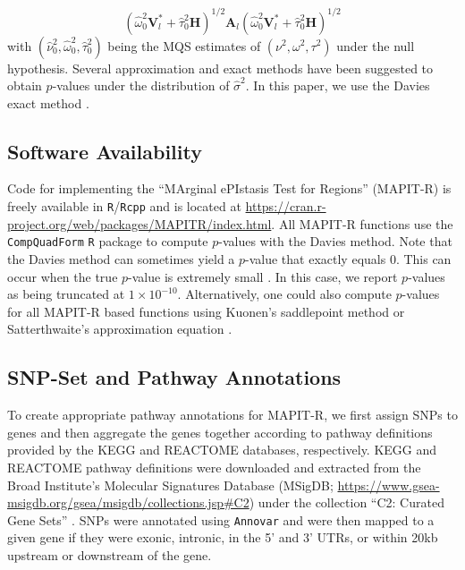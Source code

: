 \documentclass[10pt]{article}
\newcommand{\bV}{\mathbf{V}}
\newcommand{\bA}{\mathbf{A}}
\newcommand{\bH}{\mathbf{H}}
\newcommand{\wh}{\widehat}
\begin{document}
\begin{equation*}
\left(\wh\omega^2_{0}\bV^*_l+\wh\tau^2_{0}\bH\right)^{1/2}\bA_{l}\left(\wh\omega^2_{0}\bV^*_l+\wh\tau^2_{0}\bH\right)^{1/2} 
\end{equation*}
with $(\wh\nu^2_{0},\wh\omega^2_{0},\wh\tau^2_{0})$ being the MQS estimates of $(\nu^2,\omega^2,\tau^2)$ under the null hypothesis. Several approximation and exact methods have been suggested to obtain $p$-values under the distribution of $\wh\sigma^2$. In this paper, we use the Davies exact method \cite{Davies1980,Wu2011}. 

\subsection*{Software Availability}

Code for implementing the ``MArginal ePIstasis Test for Regions'' (MAPIT-R) is freely available in \texttt{R}/\texttt{Rcpp} and is located at \url{https://cran.r-project.org/web/packages/MAPITR/index.html}. All MAPIT-R functions use the \texttt{CompQuadForm} \texttt{R} package to compute $p$-values with the Davies method. Note that the Davies method can sometimes yield a $p$-value that exactly equals 0. This can occur when the true $p$-value is extremely small \cite{Chen2013}. In this case, we report $p$-values as being truncated at $1\times10^{-10}$. Alternatively, one could also compute $p$-values for all MAPIT-R based functions using Kuonen's saddlepoint method \cite{Chen2013,Kuonen1999} or Satterthwaite's approximation equation \cite{Satterthwaite1946}.

\subsection*{SNP-Set and Pathway Annotations}

To create appropriate pathway annotations for MAPIT-R, we first assign SNPs to genes and then aggregate the genes together according to pathway definitions provided by the KEGG and REACTOME databases, respectively. KEGG and REACTOME pathway definitions were downloaded and extracted from the Broad Institute's Molecular Signatures Database (MSigDB; \url{https://www.gsea-msigdb.org/gsea/msigdb/collections.jsp#C2}) under the collection ``C2: Curated Gene Sets'' \cite{Liberzon2011}. SNPs were annotated using \texttt{Annovar} \cite{Wang2010a} and were then mapped to a given gene if they were exonic, intronic, in the 5' and 3' UTRs, or within 20kb upstream or downstream of the gene.
\end{document}
